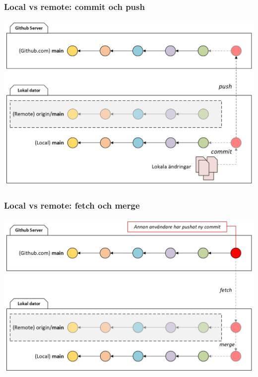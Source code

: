 \begin{frame}
    \frametitle{Local vs remote: commit och push}

    \begin{center}
            \includegraphics[width=.9\textwidth]{figs/local_remote_commit_push.png}
    \end{center}

\end{frame}

\begin{frame}
    \frametitle{Local vs remote: fetch och merge}

    \begin{center}
            \includegraphics[width=.9\textwidth]{figs/local_remote_fetch_merge.png}
    \end{center}

\end{frame}

